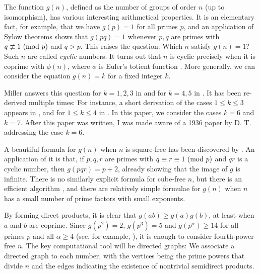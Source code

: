 The function $g(n)$, defined as the number of groups of order $n$ (up to isomorphism), has various interesting arithmetical properties.
It is an elementary fact, for example, that we have $g(p) = 1$ for all primes $p$, and an application of Sylow theorems shows that
$g(pq) = 1$ whenever $p, q$ are primes with $q \not\equiv 1 \ (\mathrm{mod} \ p)$ and $q > p$.
This raises the question: Which $n$ satisfy $g(n) = 1$? Such $n$ are called \emph{cyclic} numbers.
It turns out that $n$ is cyclic precisely when it is coprime with $\phi(n)$, where $\phi$ is Euler's totient function {\cite{szele}}.
More generally, we can consider the equation $g(n) = k$ for a fixed integer $k$.

Miller answers this question for $k = 1, 2, 3$ in {\cite{miller1}} and for $k = 4, 5$ in {\cite{miller2}}.
It has been re-derived multiple times: For instance, a short derivation of the cases $1 \le k \le 3$ appears in {\cite{olsson}},
and for $1 \le k \le 4$ in {\cite{gnumoas}}.
In this paper, we consider the cases $k = 6$ and $k = 7$.
After this paper was written, I was made aware of a 1936 paper by D. T. {\cite{sigley}} addressing the case \mbox{$k = 6$.}

A beautiful formula for $g(n)$ when $n$ is square-free has been discovered by  {\cite[Thm.~5.1]{gnumoas}}.
An application of it is that, if $p, q, r$ are primes with $q \equiv r \equiv 1 \ (\mathrm{mod} \ p)$ and $qr$ is a cyclic number, then $g(pqr) = p + 2$, already showing that the image of $g$ is infinite.
There is no similarly explicit formula for cube-free $n$, but there is an efficient algorithm {\cite{cube-free}},
and there are relatively simple formulae for $g(n)$ when $n$ has a small number of prime factors with small exponents.

By forming direct products, it is clear that $g(ab) \ge g(a)g(b)$, at least when $a$ and $b$ are coprime.
Since \mbox{$g(p^2) = 2$,} $g(p^3) = 5$ and $g(p^\alpha) \ge 14$ for all primes $p$ and all $\alpha \ge 4$
(see, for example, \cite[Thm.~3.1]{gnumoas}), it is enough to consider fourth-power-free $n$.
The key computational tool will be directed graphs: We associate a directed graph to each number,
with the vertices being the prime powers that divide $n$ and the edges indicating the existence of nontrivial semidirect products.
